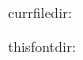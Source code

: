 \documentclass[12pt,a4paper]{article}
\begin{document}
currfiledir: \currfiledir

thisfontdir: \allfontsdir
\end{document}
